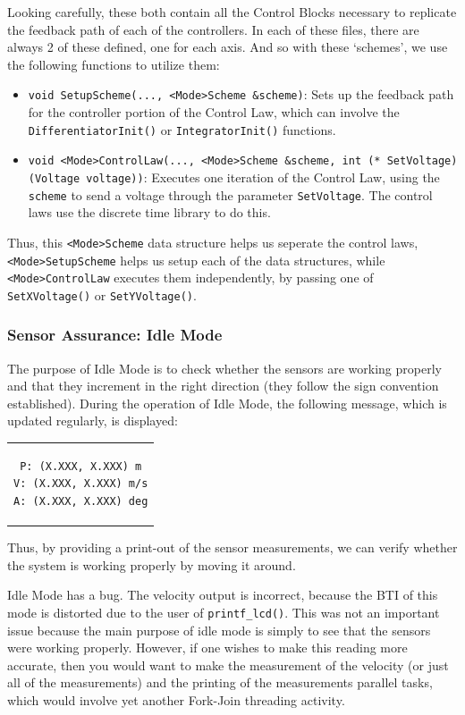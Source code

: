 \documentclass[letterpaper]{article}
\begin{document}
Looking carefully, these both contain all the Control Blocks necessary to replicate the feedback path of each of the controllers. In each of these files, there are always 2 of these defined, one for each axis. And so with these `schemes', we use the following functions to utilize them:
\begin{itemize}
    \item \texttt{void SetupScheme(..., <Mode>Scheme \&scheme)}: Sets up the feedback path for the controller portion of the Control Law, which can involve the \texttt{DifferentiatorInit()} or \texttt{IntegratorInit()} functions.
    \item \texttt{void <Mode>ControlLaw(..., <Mode>Scheme \&scheme, int (* SetVoltage)(Voltage voltage))}: Executes one iteration of the Control Law, using the \texttt{scheme} to send a voltage through the parameter \texttt{SetVoltage}. The control laws use the discrete time library to do this.
\end{itemize}
Thus, this \texttt{<Mode>Scheme} data structure helps us seperate the control laws, \texttt{<Mode>SetupScheme} helps us setup each of the data structures, while \texttt{<Mode>ControlLaw} executes them independently, by passing one of \texttt{SetXVoltage()} or \texttt{SetYVoltage()}.

\subsubsection{Sensor Assurance: Idle Mode}
The purpose of Idle Mode is to check whether the sensors are working properly and that they increment in the right direction (they follow the sign convention established). During the operation of Idle Mode, the following message, which is updated regularly, is displayed:
\begin{center}
    \begin{tabular}{c}
        \begin{lstlisting}
P: (X.XXX, X.XXX) m
V: (X.XXX, X.XXX) m/s
A: (X.XXX, X.XXX) deg
        \end{lstlisting}
    \end{tabular}
\end{center}
Thus, by providing a print-out of the sensor measurements, we can verify whether the system is working properly by moving it around.
\begin{tcolorbox}[colframe=blue!50!black!70,title=Future Modification]
    Idle Mode has a bug. The velocity output is incorrect, because the BTI of this mode is distorted due to the user of \texttt{printf\_lcd()}. This was not an important issue because the main purpose of idle mode is simply to see that the sensors were working properly. However, if one wishes to make this reading more accurate, then you would want to make the measurement of the velocity (or just all of the measurements) and the printing of the measurements parallel tasks, which would involve yet another Fork-Join threading activity.
\end{tcolorbox}
\end{document}
